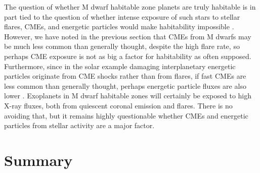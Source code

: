 \documentclass[preprint]{aastex}
\begin{document}
     The question of whether M dwarf habitable zone planets are truly
habitable is in part tied to the question of whether intense exposure
of such stars to stellar flares, CMEs, and energetic particles would
make habitability impossible \citep[e.g.,][]{mlk07,ay17}.
However, we have noted in the previous
section that CMEs from M dwarfs may be much less common than generally
thought, despite the high flare rate, so perhaps CME exposure is not
as big a factor for habitability as often supposed.  Furthermore, since
in the solar example damaging interplanetary energetic particles
originate from CME shocks rather than from flares, if fast CMEs are
less common than generally thought, perhaps energetic particle fluxes
are also lower \citep{ff19}.
Exoplanets in M dwarf habitable zones will certainly
be exposed to high X-ray fluxes, both from quiescent
coronal emission and flares.  There is no avoiding that, but it
remains highly questionable whether CMEs and energetic particles from
stellar activity are a major factor.




\section{Summary}
\end{document}
